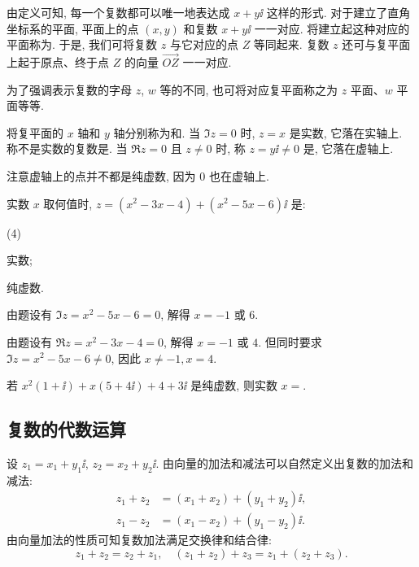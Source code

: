 由定义可知, 每一个复数都可以唯一地表达成 $x+y\ii$ 这样的形式.
对于建立了直角坐标系的平面, 平面上的点 $(x,y)$ 和复数 $x+y\ii$ 一一对应.
将建立起这种对应的平面称为.
于是, 我们可将复数 $z$ 与它对应的点 $Z$ 等同起来.
复数 $z$ 还可与复平面上起于原点、终于点 $Z$ 的向量 $\overrightarrow{OZ}$ 一一对应.

为了强调表示复数的字母 $z$, $w$ 等的不同, 也可将对应复平面称之为 $z$ 平面、$w$ 平面等等.

将复平面的 $x$ 轴和 $y$ 轴分别称为和.
当 $\Im z=0$ 时, $z=x$ 是实数, 它落在实轴上.
称不是实数的复数是.
当 $\Re z=0$ 且 $z\neq 0$ 时, 称 $z=y\ii\neq 0$ 是, 它落在虚轴上.

\begin{marker}
  注意虚轴上的点并不都是纯虚数, 因为 $0$ 也在虚轴上.
\end{marker}

\begin{example}
  实数 $x$ 取何值时, $z=(x^2-3x-4)+(x^2-5x-6)\ii$ 是:
  \begin{subexample}(4)
    \item 实数;
    \item 纯虚数.
  \end{subexample}
\end{example}

\begin{solutionenum}
  \item 由题设有 $\Im z=x^2-5x-6=0$, 解得 $x=-1$ 或 $6$.
  \item 由题设有 $\Re z=x^2-3x-4=0$, 解得 $x=-1$ 或 $4$.
  但同时要求 $\Im z=x^2-5x-6\neq 0$, 因此 $x\neq -1, x=4$.
\end{solutionenum}

\begin{exercise}
  若 $x^2(1+\ii)+x(5+4\ii)+4+3\ii$ 是纯虚数, 则实数 $x=$\fillblank{}.
\end{exercise}


\subsection{复数的代数运算}

设 $z_1=x_1+y_1\ii$, $z_2=x_2+y_2\ii$.
由向量的加法和减法可以自然定义出复数的加法和减法:
\begin{align*}
  z_1+z_2&=(x_1+x_2)+(y_1+y_2)\ii,\\
  z_1-z_2&=(x_1-x_2)+(y_1-y_2)\ii.
\end{align*}
由向量加法的性质可知复数加法满足交换律和结合律:
\[
  z_1+z_2=z_2+z_1,\quad (z_1+z_2)+z_3=z_1+(z_2+z_3).
\]

